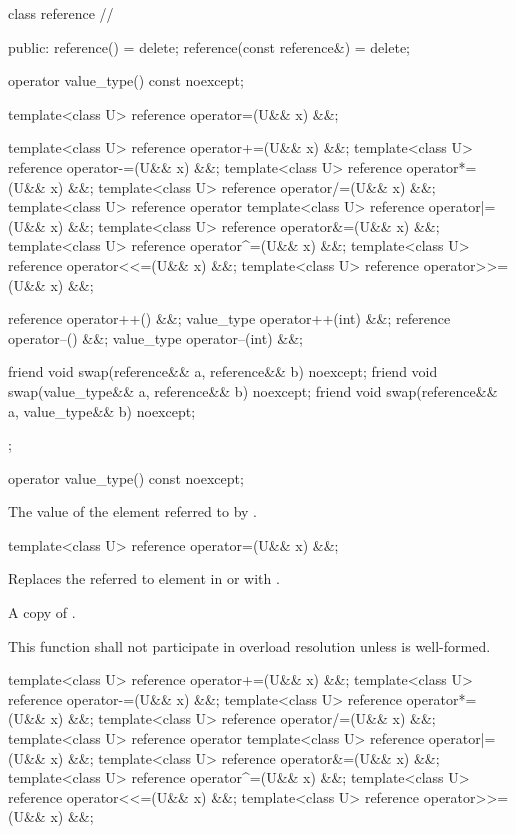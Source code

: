 \begin{codeblock}
class reference // \expos
{
public:
  reference() = delete;
  reference(const reference&) = delete;

  operator value_type() const noexcept;

  template<class U> reference operator=(U&& x) &&;

  template<class U> reference operator+=(U&& x) &&;
  template<class U> reference operator-=(U&& x) &&;
  template<class U> reference operator*=(U&& x) &&;
  template<class U> reference operator/=(U&& x) &&;
  template<class U> reference operator%
  template<class U> reference operator|=(U&& x) &&;
  template<class U> reference operator&=(U&& x) &&;
  template<class U> reference operator^=(U&& x) &&;
  template<class U> reference operator<<=(U&& x) &&;
  template<class U> reference operator>>=(U&& x) &&;

  reference operator++() &&;
  value_type operator++(int) &&;
  reference operator--() &&;
  value_type operator--(int) &&;

  friend void swap(reference&& a, reference&& b) noexcept;
  friend void swap(value_type&& a, reference&& b) noexcept;
  friend void swap(reference&& a, value_type&& b) noexcept;
};
\end{codeblock}

\begin{itemdecl}
operator value_type() const noexcept;
\end{itemdecl}

\begin{itemdescr}
  \pnum\returns
  The value of the element referred to by .
\end{itemdescr}

\begin{itemdecl}
template<class U> reference operator=(U&& x) &&;
\end{itemdecl}

\begin{itemdescr}
  \pnum\effects
  Replaces the referred to element in  or  with .

  \pnum\returns
  A copy of .

  \pnum\remarks
  This function shall not participate in overload resolution unless  is well-formed.
\end{itemdescr}

\begin{itemdecl}
template<class U> reference operator+=(U&& x) &&;
template<class U> reference operator-=(U&& x) &&;
template<class U> reference operator*=(U&& x) &&;
template<class U> reference operator/=(U&& x) &&;
template<class U> reference operator%
template<class U> reference operator|=(U&& x) &&;
template<class U> reference operator&=(U&& x) &&;
template<class U> reference operator^=(U&& x) &&;
template<class U> reference operator<<=(U&& x) &&;
template<class U> reference operator>>=(U&& x) &&;
\end{itemdecl}

